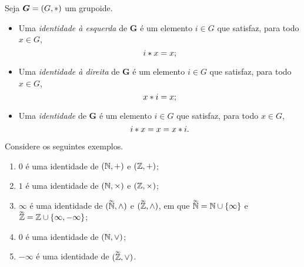 \begin{comment}
\begin{definition}[Identidade]
Seja $\bm G=(G,\opb)$ um grupoide.
	\begin{itemize}
	\item Uma \emph{identidade à esquerda} de $\bm G$ é um elemento $\id \in G$ que satisfaz, para todo $x \in G$,
		\begin{equation*}
		\id \opb x = x;
		\end{equation*}
	\item Uma \emph{identidade à direita} de $\bm G$ é um elemento $\id \in G$ que satisfaz, para todo $x \in G$,
		\begin{equation*}
		x \opb \id = x;
		\end{equation*}
	\item Uma \emph{identidade} de $\bm G$ é um elemento $\id \in G$ que satisfaz, para todo $x \in G$,
		\begin{equation*}
		\id \opb x = x = x \opb \id.
		\end{equation*}
	\end{itemize}
\end{definition}
\end{comment}

\begin{definition}[Identidade]
Seja $\bm G=(G,\ast)$ um grupoide.
	\begin{itemize}
	\item Uma \emph{identidade à esquerda} de $\bm G$ é um elemento $i \in G$ que satisfaz, para todo $x \in G$,
		\begin{equation*}
		i \ast x = x;
		\end{equation*}
	\item Uma \emph{identidade à direita} de $\bm G$ é um elemento $i \in G$ que satisfaz, para todo $x \in G$,
		\begin{equation*}
		x \ast i = x;
		\end{equation*}
	\item Uma \emph{identidade} de $\bm G$ é um elemento $i \in G$ que satisfaz, para todo $x \in G$,
		\begin{equation*}
		i \ast x = x = x \ast i.
		\end{equation*}
	\end{itemize}
\end{definition}

\begin{example}
Considere os seguintes exemplos.
	\begin{enumerate}
	\item $0$ é uma identidade de $(\mathbb{N},+)$ e $(\mathbb{Z},+)$;
	\item $1$ é uma identidade de $(\mathbb{N},\times)$ e $(\mathbb{Z},\times)$;
	\item $\infty$ é uma identidade de $(\accentset{\infty}{\mathbb{N}},\mathbin{\wedge})$ e $(\accentset{\infty}{\mathbb{Z}},\mathbin{\wedge})$, em que $\accentset{\infty}{\mathbb{N}} = \mathbb{N} \cup \{\infty\}$ e $\accentset{\infty}{\mathbb{Z}} = \mathbb{Z} \cup \{\infty,-\infty\}$;
	\item $0$ é uma identidade de $(\mathbb{N},\mathbin{\vee})$;
	\item $-\infty$ é uma identidade de $(\accentset{\infty}{\mathbb{Z}},\mathbin{\vee})$.
	\end{enumerate}
\end{example}

